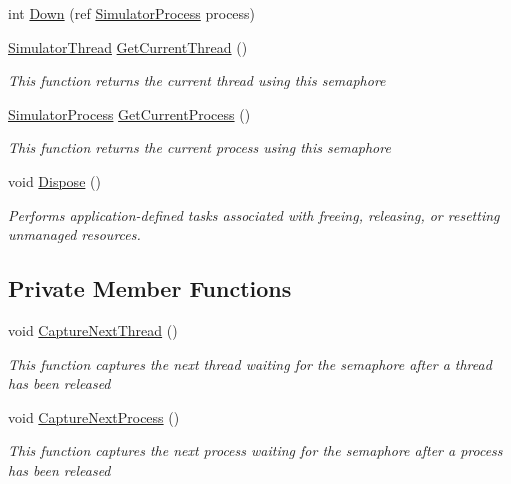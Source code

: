 \begin{DoxyCompactItemize}
int \hyperlink{class_c_p_u___o_s___simulator_1_1_operating___system_1_1_threading_1_1_semaphore_a22ec2c746ac1936cb2451f032292868c}{Down} (ref \hyperlink{class_c_p_u___o_s___simulator_1_1_operating___system_1_1_simulator_process}{Simulator\+Process} process)
\item 
\hyperlink{class_c_p_u___o_s___simulator_1_1_operating___system_1_1_threading_1_1_simulator_thread}{Simulator\+Thread} \hyperlink{class_c_p_u___o_s___simulator_1_1_operating___system_1_1_threading_1_1_semaphore_a9861d826aa6e3b0c8358563a7dfa982b}{Get\+Current\+Thread} ()
\begin{DoxyCompactList}\small\item\em This function returns the current thread using this semaphore \end{DoxyCompactList}\item 
\hyperlink{class_c_p_u___o_s___simulator_1_1_operating___system_1_1_simulator_process}{Simulator\+Process} \hyperlink{class_c_p_u___o_s___simulator_1_1_operating___system_1_1_threading_1_1_semaphore_a44c628f33567e65a68325c1a87e2837d}{Get\+Current\+Process} ()
\begin{DoxyCompactList}\small\item\em This function returns the current process using this semaphore \end{DoxyCompactList}\item 
void \hyperlink{class_c_p_u___o_s___simulator_1_1_operating___system_1_1_threading_1_1_semaphore_ae57f72f85556cefc3cfeb2840cc1984a}{Dispose} ()
\begin{DoxyCompactList}\small\item\em Performs application-\/defined tasks associated with freeing, releasing, or resetting unmanaged resources. \end{DoxyCompactList}\end{DoxyCompactItemize}
\subsection*{Private Member Functions}
\begin{DoxyCompactItemize}
\item 
void \hyperlink{class_c_p_u___o_s___simulator_1_1_operating___system_1_1_threading_1_1_semaphore_ad60e03cbc54c47059390547e17171f04}{Capture\+Next\+Thread} ()
\begin{DoxyCompactList}\small\item\em This function captures the next thread waiting for the semaphore after a thread has been released \end{DoxyCompactList}\item 
void \hyperlink{class_c_p_u___o_s___simulator_1_1_operating___system_1_1_threading_1_1_semaphore_a771b24de24c83bf3d8bd1af6a0b41cf8}{Capture\+Next\+Process} ()
\begin{DoxyCompactList}\small\item\em This function captures the next process waiting for the semaphore after a process has been released \end{DoxyCompactList}\end{DoxyCompactItemize}
